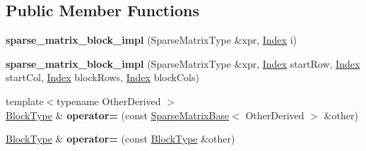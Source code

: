\subsection*{Public Member Functions}
\begin{DoxyCompactItemize}
\item 
\mbox{\label{class_eigen_1_1internal_1_1sparse__matrix__block__impl_a774cbba24725f7aff7dd861ea497726e}} 
{\bfseries sparse\+\_\+matrix\+\_\+block\+\_\+impl} (Sparse\+Matrix\+Type \&xpr, \hyperlink{group___core___module_a554f30542cc2316add4b1ea0a492ff02}{Index} i)
\item 
\mbox{\label{class_eigen_1_1internal_1_1sparse__matrix__block__impl_af1e7119b5d54afe75bf374e2e5600e32}} 
{\bfseries sparse\+\_\+matrix\+\_\+block\+\_\+impl} (Sparse\+Matrix\+Type \&xpr, \hyperlink{group___core___module_a554f30542cc2316add4b1ea0a492ff02}{Index} start\+Row, \hyperlink{group___core___module_a554f30542cc2316add4b1ea0a492ff02}{Index} start\+Col, \hyperlink{group___core___module_a554f30542cc2316add4b1ea0a492ff02}{Index} block\+Rows, \hyperlink{group___core___module_a554f30542cc2316add4b1ea0a492ff02}{Index} block\+Cols)
\item 
\mbox{\label{class_eigen_1_1internal_1_1sparse__matrix__block__impl_a1163a9d4638cbd5f950d413805842374}} 
{\footnotesize template$<$typename Other\+Derived $>$ }\\\hyperlink{group___core___module_class_eigen_1_1_block}{Block\+Type} \& {\bfseries operator=} (const \hyperlink{group___sparse_core___module_class_eigen_1_1_sparse_matrix_base}{Sparse\+Matrix\+Base}$<$ Other\+Derived $>$ \&other)
\item 
\mbox{\label{class_eigen_1_1internal_1_1sparse__matrix__block__impl_aae730b7511c6b56fad9cc6a118b43f35}} 
\hyperlink{group___core___module_class_eigen_1_1_block}{Block\+Type} \& {\bfseries operator=} (const \hyperlink{group___core___module_class_eigen_1_1_block}{Block\+Type} \&other)
\item 
\mbox{\label{class_eigen_1_1internal_1_1sparse__matrix__block__impl_abadc00922ce8ee648673eb7d11149d59}} 

\end{DoxyCompactItemize}
